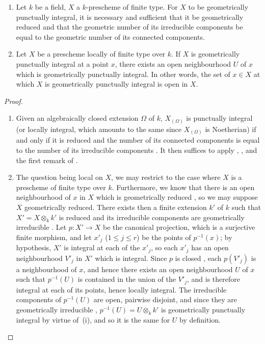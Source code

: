 \begin{proposition}[4.6.15]
\label{IV.4.6.15}
\begin{enumerate}[label=(\roman*)]
  \item Let $k$ be a field, $X$ a $k$-prescheme of finite type.
For $X$ to be geometrically punctually integral, it is necessary and sufficient that it be geometrically reduced and that the geometric number of its irreducible components be equal to the geometric number of its connected components.
  \item Let $X$ be a prescheme locally of finite type over $k$.
If $X$ is geometrically punctually integral at a point $x$, there exists an open neighbourhood $U$ of $x$ which is geometrically punctually integral.
In other words, the set of $x\in X$ at which $X$ is geometrically punctually integral is open in $X$.
\end{enumerate}
\end{proposition}

\begin{proof}
\begin{enumerate}[label=(\roman*)]
  \item Given an algebraically closed extension $\Omega$ of $k$, $X_{(\Omega)}$ is punctually integral (or locally integral, which amounts to the same since $X_{(\Omega)}$ is Noetherian) if and only if it is reduced and the number of its connected components is equal to the number of its irreducible components .
It then suffices to apply , , and the first remark of .
  \item The question being local on $X$, we may restrict to the case where $X$ is a prescheme of finite type over $k$.
Furthermore, we know that there is an open neighbourhood of $x$ in $X$ which is geometrically reduced , so we may suppose $X$ geometrically reduced.
There exists then a finite extension $k'$ of $k$ such that $X'=X\otimes_k k'$ is reduced and its irreducible components are geometrically irreducible .
Let $p:X'\to X$ be the canonical projection, which is a surjective finite morphism, and let $x'_j$ ($1\leq j\leq r$) be the points of $p^{-1}(x)$; by hypothesis, $X'$ is integral at each of the $x'_j$, so each $x'_j$ has an open neighbourhood $V'_j$ in $X'$ which is integral.
Since $p$ is closed , each $p(V'_j)$ is a neighbourhood of $x$, and hence there exists an open neighbourhood $U$ of $x$ such that $p^{-1}(U)$ is contained in the union of the $V'_j$, and is therefore integral at each of its points, hence locally integral.
The irreducible components of $p^{-1}(U)$ are open, pairwise disjoint, and since they are geometrically irreducible , $p^{-1}(U) = U\otimes_k k'$ is geometrically punctually integral by virtue of~(i), and so it is the same for $U$ by definition.
\end{enumerate}
\end{proof}

